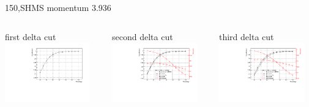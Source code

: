 \documentclass[aspectratio=169,xcolor=dvipsnames]{beamer}
\begin{document}
\begin{frame}{150,SHMS momentum 3.936}
\begin{columns}
\begin{column}[T]{0.3\textwidth}
first delta cut \\
\includegraphics[width = 0.9\textwidth]{results/pid/SHMS_rf_150_0_pos.pdf}
\end{column}
\begin{column}[T]{0.3\textwidth}
second delta cut \\
\includegraphics[width = 0.9\textwidth]{results/pid/SHMS_rf_150_1_pos.pdf}
\end{column}
\begin{column}[T]{0.3\textwidth}
third delta cut \\
\includegraphics[width = 0.9\textwidth]{results/pid/SHMS_rf_150_2_pos.pdf}

\end{column}
\end{columns}
\end{frame}
\end{document}

